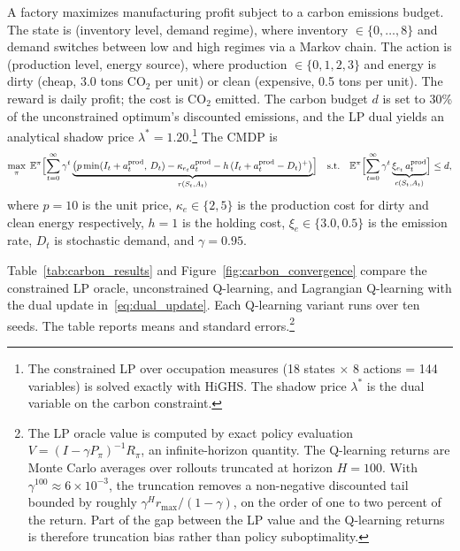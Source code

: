 A factory maximizes manufacturing profit subject to a carbon
emissions budget. The state is (inventory level, demand regime),
where inventory $\in \{0,\ldots,8\}$ and demand switches between
low and high regimes via a Markov chain. The action is
(production level, energy source), where production $\in \{0,1,2,3\}$
and energy is dirty (cheap, 3.0 tons CO$_2$ per unit) or clean
(expensive, 0.5 tons per unit). The reward is daily profit; the
cost is CO$_2$ emitted. The carbon budget $d$ is set to 30\% of the
unconstrained optimum's discounted emissions, and the LP dual
yields an analytical shadow price $\lambda^* = 1.20$.\footnote{The
constrained LP over occupation measures (18 states $\times$ 8
actions = 144 variables) is solved exactly with HiGHS. The shadow
price $\lambda^*$ is the dual variable on the carbon constraint.}
The CMDP is
\begin{equation}
  \max_\pi \; \mathbb{E}^\pi\Bigl[\sum_{t=0}^\infty \gamma^t
    \underbrace{\bigl(p \min(I_t + a^{\mathrm{prod}}_t,\, D_t)
    - \kappa_{e_t} a^{\mathrm{prod}}_t
    - h\,(I_t + a^{\mathrm{prod}}_t - D_t)^+\bigr)}_{r(S_t, A_t)}\Bigr]
  \quad \text{s.t.} \quad
  \mathbb{E}^\pi\Bigl[\sum_{t=0}^\infty \gamma^t
    \underbrace{\xi_{e_t}\, a^{\mathrm{prod}}_t}_{c(S_t, A_t)}\Bigr]
  \leq d,
  \label{eq:carbon_cmdp}
\end{equation}
where $p = 10$ is the unit price, $\kappa_e \in \{2, 5\}$ is the
production cost for dirty and clean energy respectively,
$h = 1$ is the holding cost, $\xi_e \in \{3.0, 0.5\}$ is the
emission rate, $D_t$ is stochastic demand, and $\gamma = 0.95$.

\begin{table}[h]
\centering
\caption{Carbon-constrained production results. Budget
$d = 31.35$. Q-learning rows report means and standard
errors over ten seeds.}
\label{tab:carbon_results}

\end{table}

Table~\ref{tab:carbon_results} and
Figure~\ref{fig:carbon_convergence} compare the constrained LP oracle,
unconstrained Q-learning, and Lagrangian Q-learning with the dual
update in~\eqref{eq:dual_update}. Each Q-learning variant runs over ten
seeds. The table reports means and standard errors.\footnote{The LP
oracle value is computed by exact policy evaluation
$V = (I - \gamma P_\pi)^{-1} R_\pi$, an infinite-horizon quantity. The
Q-learning returns are Monte Carlo averages over rollouts truncated at
horizon $H = 100$. With
$\gamma^{100} \approx 6\times 10^{-3}$, the truncation removes a
non-negative discounted tail bounded by roughly
$\gamma^{H} r_{\max}/(1-\gamma)$, on the order of one to two percent of
the return. Part of the gap between the LP value and the Q-learning
returns is therefore truncation bias rather than policy
suboptimality.}

